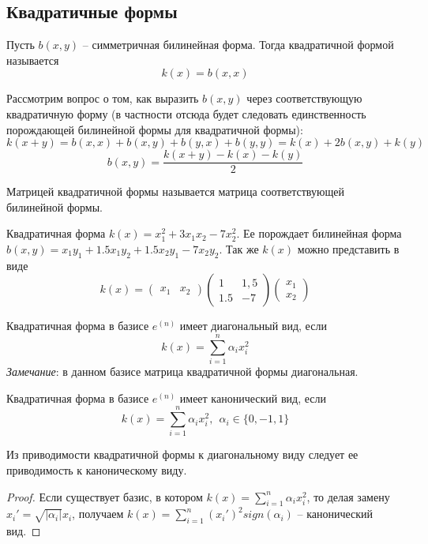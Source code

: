 \subsection{Квадратичные формы}
\begin{definition}
    Пусть $b(x,y)$ -- симметричная билинейная форма. Тогда квадратичной формой называется \[
    k(x)=b(x,x)
    \]
\end{definition}
Рассмотрим вопрос о том, как выразить $b(x,y)$ через соответствующую квадратичную форму (в частности отсюда будет следовать единственность порождающей билинейной формы для квадратичной формы):
\[
k(x+y)=b(x,x)+b(x,y)+b(y,x)+b(y,y)=k(x)+2b(x,y)+k(y)
\]
\[
b(x,y)=\frac{k(x+y)-k(x)-k(y)}{2}
\]
\begin{definition}
    Матрицей квадратичной формы называется матрица соответствующей билинейной формы.
\end{definition}
\begin{example}
    Квадратичная форма $k(x)=x_1^2+3x_1x_2-7x_2^2$. Ее порождает билинейная форма $b(x,y)=x_1y_1+1.5x_1y_2+1.5x_2y_1-7x_2y_2$. Так же $k(x)$ можно представить в виде
    \[
    k(x)=\begin{pmatrix}
        x_1&x_2
    \end{pmatrix}\begin{pmatrix}
        1&1,5\\
        1.5&-7
    \end{pmatrix}\begin{pmatrix}
        x_1\\
        x_2
    \end{pmatrix}
    \]
\end{example}
\begin{definition}
    Квадратичная форма в базисе $e^{(n)}$ имеет диагональный вид, если \[
    k(x)=\sum_{i=1}^{n} \alpha_i x_i^2
    \]
\textit{Замечание}: в данном базисе матрица квадратичной формы диагональная.
\end{definition}
\begin{definition}
    Квадратичная форма в базисе $e^{(n)}$ имеет канонический вид, если \[
    k(x)=\sum_{i=1}^{n} \alpha_i x_i^2, \ \ \alpha_i\in \{0, -1, 1\}
    \]
\end{definition}
\begin{proposition}
    Из приводимости квадратичной формы к диагональному виду следует ее приводимость к каноническому виду.
\end{proposition}
\begin{proof}
    Если существует базис, в котором $k(x)=\sum_{i=1}^{n} \alpha_i x_i^2$, то делая замену $x_i'=\sqrt{|\alpha_i|}x_i$, получаем $ k(x)=\sum_{i=1}^{n} (x_i')^2sign(\alpha_i)$ -- канонический вид.
\end{proof}
